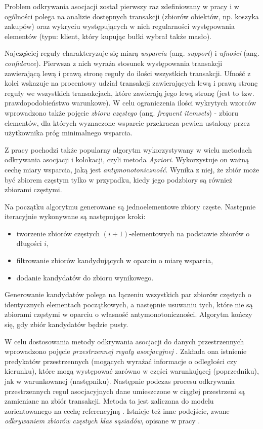 \documentclass[12pt]{article}
\begin{document}
Problem odkrywania asocjacji został pierwszy raz zdefiniowany w pracy \cite{asoc} i w ogólności polega na analizie dostępnych transakcji (zbiorów obiektów, np. koszyka zakupów) oraz wykryciu występujących w nich regularności występowania elementów (typu: klient, który kupując bułki wybrał także masło).

Najczęściej reguły charakteryzuje się miarą \textit{wsparcia} (ang. \textit{support}) i \textit{ufności} (ang. \textit{confidence}). Pierwsza z nich wyraża stosunek występowania transakcji zawierającą lewą i prawą stronę reguły do ilości wszystkich transakcji. Ufność z kolei wskazuje na procentowy udział transakcji zawierających lewą i prawą stronę reguły we wszystkich transakcjach, które zawierają jego lewą stronę (jest to tzw. prawdopodobieństwo warunkowe). W celu ograniczenia ilości wykrytych wzorców wprowadzono także pojęcie \textit{zbioru częstego} (ang. \textit{frequent itemsets}) - zbioru elementów, dla których wyznaczone wsparcie przekracza pewien ustalony przez użytkownika próg minimalnego wsparcia. 

Z pracy \cite{asoc} pochodzi także popularny algorytm wykorzystywany w wielu metodach odkrywania asocjacji i kolokacji, czyli metoda \textit{Apriori}. Wykorzystuje on ważną cechę miary wsparcia, jaką jest \textit{antymonotoniczność}. Wynika z niej, że zbiór może być zbiorem częstym tylko w przypadku, kiedy jego podzbiory są również zbiorami częstymi. 

Na początku algorytmu generowane są jednoelementowe zbiory częste. Następnie iteracyjnie wykonywane są następujące kroki:
\begin{itemize}
\item tworzenie zbiorów częstych $ (i + 1) $-elementowych na podstawie zbiorów o długości $ i $,
\item filtrowanie zbiorów kandydujących w oparciu o miarę wsparcia,
\item dodanie kandydatów do zbioru wynikowego.
\end{itemize}

Generowanie kandydatów polega na łączeniu wszystkich par zbiorów częstych o identycznych elementach początkowych, a następnie usuwaniu tych, które nie są zbiorami częstymi w oparciu o własność antymonotoniczności. Algorytm kończy się, gdy zbiór kandydatów będzie pusty.  

W celu dostosowania metody odkrywania asocjacji do danych przestrzennych wprowadzono pojęcie \textit{przestrzennej reguły asocjacyjnej} \cite{asoc2}. Zakłada ona istnienie predykatów przestrzennych (mogących wyrażać informacje o odległości czy kierunku), które mogą występować zarówno w części warunkującej (poprzedniku), jak w warunkowanej (następniku). Następnie podczas procesu odkrywania przestrzennych reguł asocjacyjnych dane umieszczone w ciągłej przestrzeni są zamieniane na zbiór transakcji. Metoda ta jest zaliczana do modelu zorientowanego na cechę referencyjną \cite{boinski}. Istnieje też inne podejście, zwane \textit{odkrywaniem zbiorów częstych klas sąsiadów}, opisane w pracy \cite{classsets}. 
\end{document}
